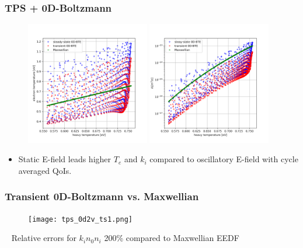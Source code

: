 \documentclass[mathserif, aspectratio=169]{beamer}
\begin{document}
\begin{frame}
	\frametitle{TPS + 0D-Boltzmann}
	\vspace{-0.4in}
	\begin{figure}
		\centering
		\includegraphics[width=0.48\textwidth]{te_vs_tg_tps_bte.png}
		\includegraphics[width=0.48\textwidth]{rates_tps_bte.png}
	\end{figure}
	\begin{itemize}
		\item Static E-field leads higher $T_e$ and $k_i$ compared to oscillatory E-field with cycle averaged QoIs. 
	\end{itemize}
\end{frame}


\begin{frame}
	\frametitle{Transient 0D-Boltzmann vs. Maxwellian}
	\begin{figure}
		\begin{center}
			\texttt{[image: tps\_0d2v\_ts1.png]}
		\end{center}
	\end{figure}
	\textbullet~ Relative errors for $k_i n_0 n_i$ 200\% compared to Maxwellian EEDF
\end{frame}
\end{document}
